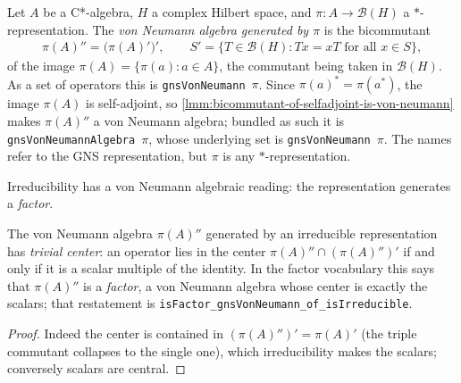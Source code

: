 \begin{definition}
    \label{def:generated-von-neumann-algebra}
    \leanok
    Let $A$ be a C*-algebra, $H$ a complex Hilbert space, and $\pi : A \to \mathcal{B}(H)$ a $*$-representation. The \emph{von Neumann algebra generated by $\pi$} is the bicommutant
    \begin{align}
        \pi(A)'' = \big(\pi(A)'\big)', \qquad S' = \{T \in \mathcal{B}(H) : T x = x T \text{ for all } x \in S\},
    \end{align}
    of the image $\pi(A) = \{\pi(a) : a \in A\}$, the commutant being taken in $\mathcal{B}(H)$. As a set of operators this is \texttt{gnsVonNeumann}~$\pi$. Since $\pi(a)^* = \pi(a^*)$, the image $\pi(A)$ is self-adjoint, so \ref{lmm:bicommutant-of-selfadjoint-is-von-neumann} makes $\pi(A)''$ a von Neumann algebra; bundled as such it is \texttt{gnsVonNeumannAlgebra}~$\pi$, whose underlying set is \texttt{gnsVonNeumann}~$\pi$. The names refer to the GNS representation, but $\pi$ is any $*$-representation.
\end{definition}

Irreducibility has a von Neumann algebraic reading: the representation generates a \emph{factor}.

\begin{theorem}
    \label{thrm:irreducible-factor}
    \leanok
    The von Neumann algebra $\pi(A)''$ generated by an irreducible representation has \emph{trivial center}: an operator lies in the center $\pi(A)'' \cap (\pi(A)'')'$ if and only if it is a scalar multiple of the identity. In the factor vocabulary this says that $\pi(A)''$ is a \emph{factor}, a von Neumann algebra whose center is exactly the scalars; that restatement is \texttt{isFactor\_gnsVonNeumann\_of\_isIrreducible}.
\end{theorem}
\begin{proof}
    \leanok
    Indeed the center is contained in $(\pi(A)'')' = \pi(A)'$ (the triple commutant collapses to the single one), which irreducibility makes the scalars; conversely scalars are central.
\end{proof}

